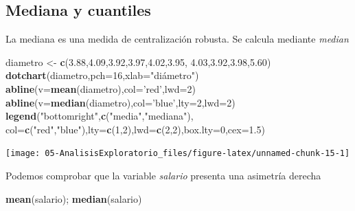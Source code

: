 \documentclass[]{book}
\newenvironment{Shaded}{\begin{snugshade}}{\end{snugshade}}
\newcommand{\DataTypeTok}[1]{\textcolor[rgb]{0.13,0.29,0.53}{#1}}
\newcommand{\DecValTok}[1]{\textcolor[rgb]{0.00,0.00,0.81}{#1}}
\newcommand{\FloatTok}[1]{\textcolor[rgb]{0.00,0.00,0.81}{#1}}
\newcommand{\KeywordTok}[1]{\textcolor[rgb]{0.13,0.29,0.53}{\textbf{#1}}}
\newcommand{\NormalTok}[1]{#1}
\newcommand{\StringTok}[1]{\textcolor[rgb]{0.31,0.60,0.02}{#1}}
\begin{document}
\hypertarget{mediana-y-cuantiles}{%
\subsection{Mediana y cuantiles}\label{mediana-y-cuantiles}}

La mediana es una medida de centralización robusta. Se calcula mediante \emph{median}

\begin{Shaded}
\begin{Highlighting}[]
\NormalTok{diametro <-}\StringTok{ }\KeywordTok{c}\NormalTok{(}\FloatTok{3.88}\NormalTok{,}\FloatTok{4.09}\NormalTok{,}\FloatTok{3.92}\NormalTok{,}\FloatTok{3.97}\NormalTok{,}\FloatTok{4.02}\NormalTok{,}\FloatTok{3.95}\NormalTok{, }\FloatTok{4.03}\NormalTok{,}\FloatTok{3.92}\NormalTok{,}\FloatTok{3.98}\NormalTok{,}\FloatTok{5.60}\NormalTok{)}
\KeywordTok{dotchart}\NormalTok{(diametro,}\DataTypeTok{pch=}\DecValTok{16}\NormalTok{,}\DataTypeTok{xlab=}\StringTok{"diámetro"}\NormalTok{)}
\KeywordTok{abline}\NormalTok{(}\DataTypeTok{v=}\KeywordTok{mean}\NormalTok{(diametro),}\DataTypeTok{col=}\StringTok{'red'}\NormalTok{,}\DataTypeTok{lwd=}\DecValTok{2}\NormalTok{)}
\KeywordTok{abline}\NormalTok{(}\DataTypeTok{v=}\KeywordTok{median}\NormalTok{(diametro),}\DataTypeTok{col=}\StringTok{'blue'}\NormalTok{,}\DataTypeTok{lty=}\DecValTok{2}\NormalTok{,}\DataTypeTok{lwd=}\DecValTok{2}\NormalTok{)}
\KeywordTok{legend}\NormalTok{(}\StringTok{"bottomright"}\NormalTok{,}\KeywordTok{c}\NormalTok{(}\StringTok{"media"}\NormalTok{,}\StringTok{"mediana"}\NormalTok{),}
       \DataTypeTok{col=}\KeywordTok{c}\NormalTok{(}\StringTok{"red"}\NormalTok{,}\StringTok{"blue"}\NormalTok{),}\DataTypeTok{lty=}\KeywordTok{c}\NormalTok{(}\DecValTok{1}\NormalTok{,}\DecValTok{2}\NormalTok{),}\DataTypeTok{lwd=}\KeywordTok{c}\NormalTok{(}\DecValTok{2}\NormalTok{,}\DecValTok{2}\NormalTok{),}\DataTypeTok{box.lty=}\DecValTok{0}\NormalTok{,}\DataTypeTok{cex=}\FloatTok{1.5}\NormalTok{)}
\end{Highlighting}
\end{Shaded}

\begin{center}\texttt{[image: 05-AnalisisExploratorio\_files/figure-latex/unnamed-chunk-15-1]} \end{center}

Podemos comprobar que la variable \emph{salario} presenta una
asimetría derecha

\begin{Shaded}
\begin{Highlighting}[]
\KeywordTok{mean}\NormalTok{(salario); }\KeywordTok{median}\NormalTok{(salario)}
\end{Highlighting}
\end{Shaded}
\end{document}
